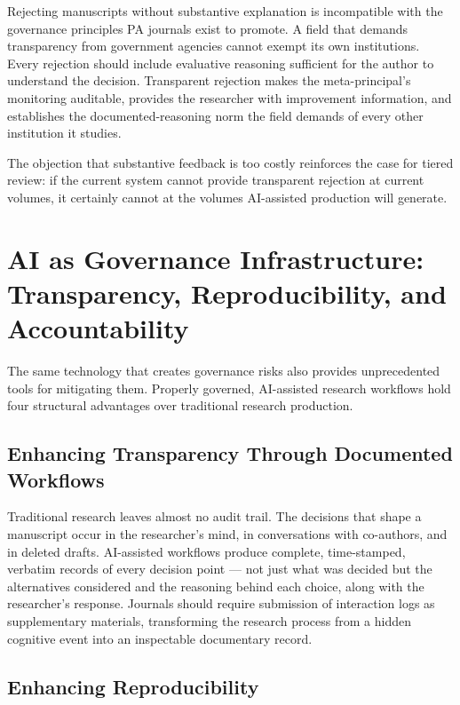 \documentclass[12pt]{article}
\begin{document}
Rejecting manuscripts without substantive explanation is incompatible with the governance
principles PA journals exist to promote. A field that demands transparency from government
agencies cannot exempt its own institutions. Every rejection should include evaluative
reasoning sufficient for the author to understand the decision. Transparent rejection makes the meta-principal's
monitoring auditable, provides the researcher with improvement information, and establishes
the documented-reasoning norm the field demands of every other institution it studies.

The objection that substantive feedback is too costly reinforces the case for tiered review:
if the current system cannot provide transparent rejection at current volumes, it certainly
cannot at the volumes AI-assisted production will generate.

\section{AI as Governance Infrastructure: Transparency, Reproducibility, and Accountability}

The same technology that creates governance risks also provides unprecedented tools for
mitigating them. Properly governed, AI-assisted research workflows hold four structural
advantages over traditional research production.

\subsection{Enhancing Transparency Through Documented Workflows}

Traditional research leaves almost no audit trail. The decisions that shape a manuscript
occur in the researcher's mind, in conversations with co-authors, and in deleted drafts.
AI-assisted workflows produce complete, time-stamped, verbatim records of every decision
point --- not just what was decided but the alternatives considered and the reasoning behind each
choice, along with the researcher's response. Journals should require submission of interaction logs as
supplementary materials, transforming the research process from a hidden cognitive event
into an inspectable documentary record.

\subsection{Enhancing Reproducibility}
\end{document}
